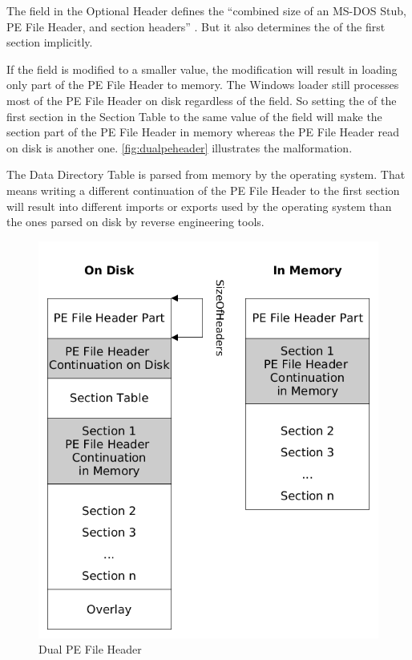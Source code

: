 The  field in the Optional Header defines the \enquote{combined size of an MS-DOS Stub, PE File Header, and section headers} \cite[]{pespec}. But it also determines the \VA{} of the first section implicitly. \cite[slide 15]{vuksan11} 

If the  field is modified to a smaller value, the modification will result in loading only part of the PE File Header to memory. The Windows loader still processes most of the PE File Header on disk regardless of the  field. So setting the \VA{} of the first section in the Section Table to the same value of the  field will make the section part of the PE File Header in memory whereas the PE File Header read on disk is another one. \autoref{fig:dualpeheader} illustrates the malformation.

The Data Directory Table is parsed from memory by the operating system. That means writing a different continuation of the PE File Header to the first section will result into \eg{} different imports or exports used by the operating system than the ones parsed on disk by reverse engineering tools.

\begin{figure}
\includegraphics[width=.98\textwidth, height=.60\textheight,keepaspectratio]{graphics/dualpeheader}
\caption{Dual PE File Header}
\label{fig:dualpeheader} 
\end{figure}

